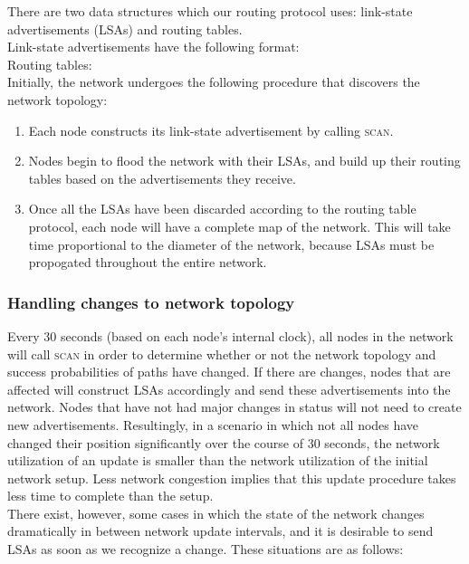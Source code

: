 \documentclass[letterpaper]{article}
\begin{document}
\noindent There are two data structures which our routing protocol uses: link-state advertisements (LSAs)
and routing tables. 
\\

\noindent Link-state advertisements have the following format:
\\

\noindent Routing tables:
\\

\noindent Initially, the network undergoes the following procedure that discovers the network topology:

\begin{enumerate}
  \item Each node constructs its link-state advertisement by calling \textsc{scan}. 
  \item Nodes begin to flood the network with their LSAs, and build up their routing tables based on
  the advertisements they receive.
  \item Once all the LSAs have been discarded according to the routing table protocol, each node will have
  a complete map of the network. This will take time proportional to the diameter of the network, because
  LSAs must be propogated throughout the entire network.
\end{enumerate}

\subsubsection{Handling changes to network topology}

Every 30 seconds (based on each node's internal clock), all nodes in the network will call \textsc{scan} in
order to determine whether or not the network topology and success probabilities of paths have changed.
If there are changes, nodes that are affected will construct LSAs accordingly and send these
advertisements into the network. Nodes that have not had major changes in status will not need to create
new advertisements. Resultingly, in a scenario in which not all nodes have changed their position
significantly over the course of 30 seconds, the network utilization of an update is smaller than the
network utilization of the initial network setup. Less network congestion implies that this update
procedure takes less time to complete than the setup.
\\

\noindent There exist, however, some cases in which the state of the network changes dramatically in 
between network update intervals, and it is desirable to send LSAs as soon as we recognize a change.
These situations are as follows:
\end{document}
